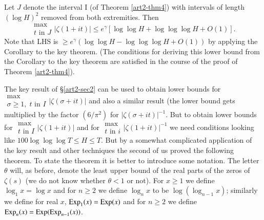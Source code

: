 \begin{theorem}\label{art2-thm5}
Let $J$ denote the interval I (of Theorem \ref{art2-thm4})  with intervals of length $(\log H)^2$ removed from both extremities. Then 
$$
\begin{matrix}
\max\\
t \text{ in } J 
\end{matrix} |\zeta (1+ it)| \leqslant e^\gamma [\log \log H + \log \log \log H+ O(1)].
$$
Note that {\rm LHS} is $\geqslant e^\gamma (\log \log H-\log \log \log H+ O(1))$ by applying the Corollary to the key theorem. (The conditions for deriving this lower bound from the Corollary to the key theorem are satisfied in the course of the proof of Theorem \ref{art2-thm4}).
\end{theorem}

The key result of \S \ref{art2-sec2} can be used to obtain lower bounds for $\begin{matrix}
\max\\\sigma \geqslant 1, \; t \text{ in } I  
\end{matrix} |\zeta (\sigma + it)| $ and also a similar result (the lower bound gets multiplied by the factor $(6/\pi^2)$ for $|\zeta(\sigma + it)|^{-1}$. But to obtain lower bounds for $\begin{matrix}
\max\\
t \text{ in } I
\end{matrix} |\zeta(1+ it)|$ and for 
$\begin{matrix}
\max\\
t \text{ in } i 
\end{matrix} |\zeta(1+ it)|^{-1}$ we need conditions looking like $100 \log \log \log T \leqslant H \leqslant T$. But by a somewhat complicated application of the key result and other techniques the second of us \cite{art2-key13} proved the following theorem. To state the theorem it is better to introduce some notation. The letter $\theta$ will, as before, denote the least upper bound of the real parts of the zeros of $\zeta(s)$ (we do not know whether $\theta <1$ or not). For $x \geqslant 1$ we define $\log_1 x = \log x$ and for $n \geqslant 2$ we define $\log_n x$ to be $\log(\log_{n-1}x)$; similarly we define for real $x$, $\operatorname{Exp}_1(x) = \operatorname{Exp} (x)$  and for $n\geqslant 2$ we define $\operatorname{Exp}_n(x) = \operatorname{Exp} (\operatorname{Exp}_{n-1} (x))$.

